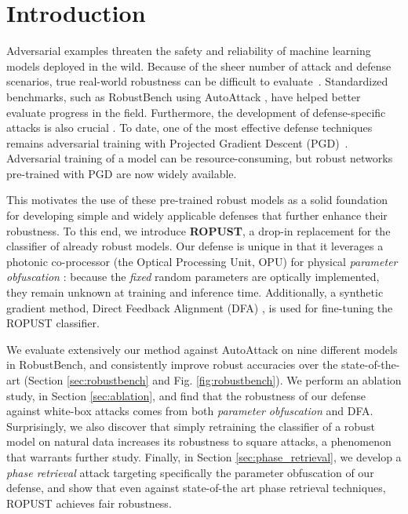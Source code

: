 \documentclass{article}
\begin{document}
\section{Introduction}
Adversarial examples \cite{Goodfellow2015ExplainingAH} threaten the safety and reliability of machine learning models deployed in the wild. Because of the sheer number of attack and defense scenarios, true real-world robustness can be difficult to evaluate~\cite{bubeck2019adversarial}. Standardized benchmarks, such as RobustBench \cite{croce2020robustbench} using AutoAttack \cite{Croce2020ReliableEO}, have helped better evaluate progress in the field. Furthermore, the development of defense-specific attacks is also crucial \cite{tramer2019adversarial}. To date, one of the most effective defense techniques remains adversarial training with Projected Gradient Descent (PGD)~\cite{madry2017towards}. Adversarial training of a model can be resource-consuming, but robust networks pre-trained with PGD are now widely available. 

This motivates the use of these pre-trained robust models as a solid foundation for developing simple and widely applicable defenses that further enhance their robustness. To this end, we introduce \textbf{ROPUST}, a drop-in replacement for the classifier of already robust models. Our defense is unique in that it leverages a photonic co-processor (the Optical Processing Unit, OPU) for physical \emph{parameter obfuscation} \cite{Cappelli2021AdversarialRB}: because the \emph{fixed} random parameters are optically implemented, they remain unknown at training and inference time. Additionally, a synthetic gradient method, Direct Feedback Alignment (DFA) \cite{Nkland2016DirectFA}, is used for fine-tuning the ROPUST classifier. 

We evaluate extensively our method against AutoAttack on nine different models in RobustBench, and consistently improve robust accuracies over the state-of-the-art (Section \ref{sec:robustbench} and Fig. \ref{fig:robustbench}). We perform an ablation study, in Section \ref{sec:ablation}, and find that the robustness of our defense against white-box attacks comes from both \emph{parameter obfuscation} and DFA. Surprisingly, we also discover that simply retraining the classifier of a robust model on natural data increases its robustness to square attacks, a phenomenon that warrants further study. Finally, in Section \ref{sec:phase_retrieval}, we develop a \emph{phase retrieval} attack targeting specifically the parameter obfuscation of our defense, and show that even against state-of-the art phase retrieval techniques, ROPUST achieves fair robustness.
\end{document}
